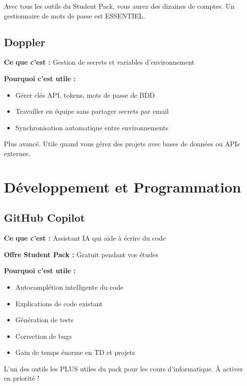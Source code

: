 \documentclass[11pt,a4paper]{article}
\begin{document}
\begin{important}
Avec tous les outils du Student Pack, vous aurez des dizaines de comptes. Un gestionnaire de mots de passe est ESSENTIEL.
\end{important}

\subsection{Doppler}

\textbf{Ce que c'est :} Gestion de secrets et variables d'environnement

\textbf{Pourquoi c'est utile :}
\begin{itemize}
    \item Gérer clés API, tokens, mots de passe de BDD
    \item Travailler en équipe sans partager secrets par email
    \item Synchronisation automatique entre environnements
\end{itemize}

\begin{conseil}
Plus avancé. Utile quand vous gérez des projets avec bases de données ou APIs externes.
\end{conseil}

\newpage
\section{Développement et Programmation}

\subsection{GitHub Copilot}

\textbf{Ce que c'est :} Assistant IA qui aide à écrire du code

\textbf{Offre Student Pack :} Gratuit pendant vos études

\textbf{Pourquoi c'est utile :}
\begin{itemize}
    \item Autocomplétion intelligente du code
    \item Explications de code existant
    \item Génération de tests
    \item Correction de bugs
    \item Gain de temps énorme en TD et projets
\end{itemize}

\begin{important}
L'un des outils les PLUS utiles du pack pour les cours d'informatique. À activer en priorité !
\end{important}
\end{document}
